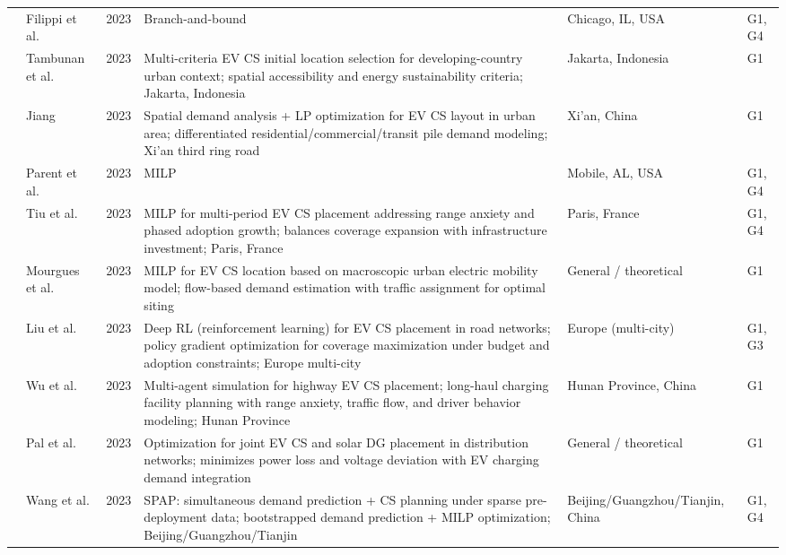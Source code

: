 \documentclass[letterpaper, 12pt, oneside, doublespacing]{Thesis}
\begin{document}
\begin{longtable}{L{0.9cm} L{2.2cm} L{0.8cm} L{3.3cm} L{2.5cm} L{1.5cm}}
\cite{incorporating_time-dependent_2023} & Filippi et al. & 2023 & Branch-and-bound & Chicago, IL, USA & G1, G4 \\
\cite{initial_location_2023} & Tambunan et al. & 2023 & Multi-criteria EV CS initial location selection for developing-country urban context; spatial accessibility and energy sustainability criteria; Jakarta, Indonesia & Jakarta, Indonesia & G1 \\
\cite{layout_and_2023} & Jiang & 2023 & Spatial demand analysis + LP optimization for EV CS layout in urban area; differentiated residential/commercial/transit pile demand modeling; Xi'an third ring road & Xi'an, China & G1 \\
\cite{maximum_flow-based_2023} & Parent et al. & 2023 & MILP & Mobile, AL, USA & G1, G4 \\
\cite{on_the_2023} & Tiu et al. & 2023 & MILP for multi-period EV CS placement addressing range anxiety and phased adoption growth; balances coverage expansion with infrastructure investment; Paris, France & Paris, France & G1, G4 \\
\cite{optimal_location_2023} & Mourgues et al. & 2023 & MILP for EV CS location based on macroscopic urban electric mobility model; flow-based demand estimation with traffic assignment for optimal siting & General {\slash} theoretical & G1 \\
\cite{optimal_placement_2023} & Liu et al. & 2023 & Deep RL (reinforcement learning) for EV CS placement in road networks; policy gradient optimization for coverage maximization under budget and adoption constraints; Europe multi-city & Europe (multi-city) & G1, G3 \\
\cite{optimizing_electric_2023} & Wu et al. & 2023 & Multi-agent simulation for highway EV CS placement; long-haul charging facility planning with range anxiety, traffic flow, and driver behavior modeling; Hunan Province & Hunan Province, China & G1 \\
\cite{placement_of_2023} & Pal et al. & 2023 & Optimization for joint EV CS and solar DG placement in distribution networks; minimizes power loss and voltage deviation with EV charging demand integration & General {\slash} theoretical & G1 \\
\cite{spap_simultaneous_2023} & Wang et al. & 2023 & SPAP: simultaneous demand prediction + CS planning under sparse pre-deployment data; bootstrapped demand prediction + MILP optimization; Beijing/Guangzhou/Tianjin & Beijing{\slash}Guangzhou{\slash}Tianjin, China & G1, G4 \\

\end{longtable}
\end{document}
